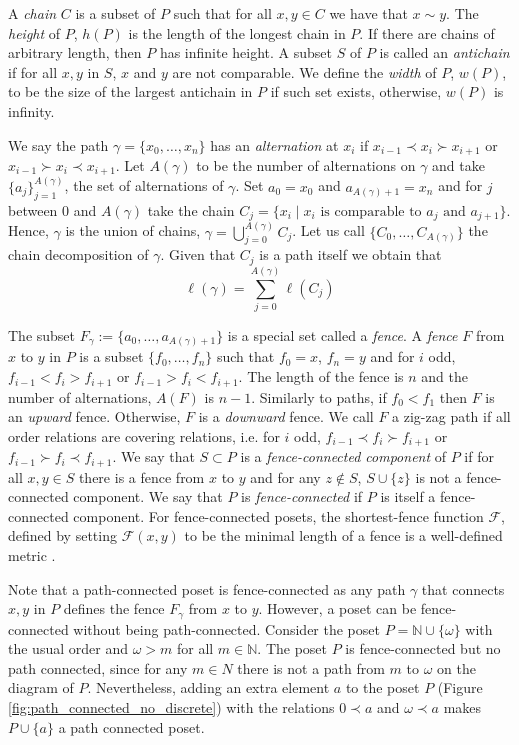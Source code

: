 \documentclass{article}[12pt]
\theoremstyle{exampstyle}
\theoremstyle{remark}
\newcommand{\N}{\mathbb{N}}
\newcommand{\F}{\mathcal{F}}
\newcommand{\tuple}[3][1]{#2_{#1}, \dots , #2_{#3}}
\begin{document}
A \textit{chain} $C$ is a subset of $P$ such that for all $x,y \in C$ we have that $x \sim y$. The \textit{height} of $P$, $h(P)$ is the length of the longest chain in $P$. If there are chains of arbitrary length, then $P$ has infinite height. A subset $S$  of $P$ is called an \textit{antichain} if for all $x,y$ in $S$, $x$ and $y$ are not comparable. We define the \textit{width} of $P$, $w(P)$, to be the size of the largest antichain in $P$ if such set exists, otherwise, $w(P)$ is infinity.

We say the path $\gamma =  \{ \tuple[0]{x}{n}\}$ has an \textit{alternation} at $x_i$ if $x_{i-1} \prec x_i \succ x_{i+1}$ or $x_{i-1} \succ x_i \prec x_{i+1}$. Let $A(\gamma)$ to be the number of alternations on $\gamma$ and take $\{ a_{j}\}_{j=1}^{A(\gamma)}$, the set of alternations of $\gamma$. Set $a_0 = x_0$ and $a_{A(\gamma) + 1} = x_n$ and for $j$ between $0$ and $A(\gamma)$ take the chain $C_j = \{ x_i \mid x_i \text{ 
is comparable to } a_j \text{ and } a_{j+1} \}$. Hence, $\gamma$ is the union of chains, $\gamma = \bigcup_{j=0}^{A(\gamma)} C_{j}$. Let us call $\{\tuple[0]{C}{A(\gamma)}\}$ the chain decomposition of $\gamma$. Given that $C_j$ is a path itself we obtain that 
\begin{equation*}
    \ell(\gamma) = \sum_{j=0}^{A(\gamma)} \ell(C_j) 
\end{equation*}

The subset $F_\gamma := \{\tuple[0]{a}{A(\gamma) + 1} \}$ is a special set called a \textit{fence}. A \textit{fence} $F$ from $x$ to $y$ in $P$ is a subset $\{ \tuple[0]{f}{n} \}$ such that $f_0 = x$, $f_n = y$ and for $i$ odd, $f_{i-1} < f_i > f_{i+1}$ or  $f_{i-1} > f_i < f_{i+1}$. The length of the fence is $n$ and the number of alternations, $A(F)$ is $n-1$. Similarly to paths, if $f_0 < f_1$ then $F$ is an \textit{upward} fence. Otherwise, $F$ is a \textit{downward} fence. We call $F$ a zig-zag path if all order relations are covering relations, i.e. for $i$ odd, $f_{i-1} \prec f_i \succ f_{i+1}$ or  $f_{i-1} \succ f_i \prec f_{i+1}$. We say that $S \subset P$ is a \textit{fence-connected component} of $P$ if for all $x,y \in S$ there is a fence from $x$ to $y$ and for any $z \notin S$, $S \cup \{z\}$  is not a fence-connected component. We say that $P$ is \textit{fence-connected} if $P$ is itself a fence-connected component. For fence-connected posets, the shortest-fence function $\F$, defined by setting $\F(x,y)$ to be the minimal length of a fence is a well-defined metric \cite{belding}.

Note that a path-connected poset is fence-connected as any path $\gamma$ that connects $x,y$ in $P$ defines the fence $F_\gamma$ from $x$ to $y$. However, a poset can be fence-connected without being path-connected. Consider the poset $P = \N \cup \{\omega\}$ with the usual order and $\omega > m$ for all $m \in \N$. The poset $P$ is fence-connected but no path connected, since for any $m \in N$ there is not a path from $m$ to $\omega$ on the diagram of $P$. Nevertheless, adding an extra element $a$ to the poset $P$ (Figure \ref{fig:path_connected_no_discrete}) with the relations $0 \prec a$ and  $\omega \prec a$ makes $P \cup \{a\}$ a path connected poset. 
\end{document}
